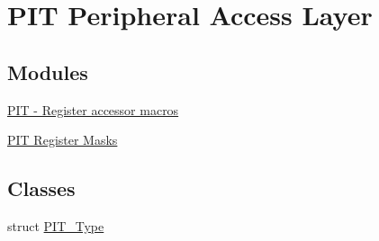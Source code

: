 \hypertarget{group__PIT__Peripheral__Access__Layer}{}\section{P\+IT Peripheral Access Layer}
\label{group__PIT__Peripheral__Access__Layer}
\subsection*{Modules}
\begin{DoxyCompactItemize}
\item 
\hyperlink{group__PIT__Register__Accessor__Macros}{P\+I\+T -\/ Register accessor macros}
\item 
\hyperlink{group__PIT__Register__Masks}{P\+I\+T Register Masks}
\end{DoxyCompactItemize}
\subsection*{Classes}
\begin{DoxyCompactItemize}
\item 
struct \hyperlink{structPIT__Type}{P\+I\+T\+\_\+\+Type}
\end{DoxyCompactItemize}
